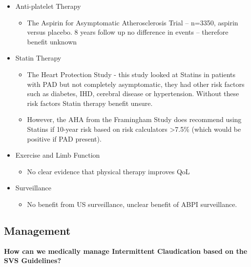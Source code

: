 \documentclass[
]{book}
\providecommand{\tightlist}{%
  \setlength{\itemsep}{0pt}\setlength{\parskip}{0pt}}
\begin{document}
\begin{itemize}
\item
  Anti-platelet Therapy

  \begin{itemize}
  \tightlist
  \item
    The Aspirin for Asymptomatic Atherosclerosis Trial -- n=3350,
    aspirin versus placebo. 8 years follow up no difference in
    events \citep{fowkesAspirinPreventionCardiovascular2010} -- therefore
    benefit unknown
  \end{itemize}
\item
  Statin Therapy

  \begin{itemize}
  \item
    The Heart Protection Study
    \citep{heartprotectionstudycollaborativegroupRandomizedTrialEffects2007} -
    this study looked at Statins in patients with PAD but not
    completely asymptomatic, they had other risk factors such as
    diabetes, IHD, cerebral disease or hypertension. Without these
    risk factors Statin therapy benefit unsure.
  \item
    However, the AHA from the Framingham Study does recommend using
    Statins if 10-year risk based on risk calculators \textgreater7.5\% (which
    would be positive if PAD present).
  \end{itemize}
\item
  Exercise and Limb Function

  \begin{itemize}
  \tightlist
  \item
    No clear evidence that physical therapy improves QoL
  \end{itemize}
\item
  Surveillance

  \begin{itemize}
  \tightlist
  \item
    No benefit from US surveillance, unclear benefit of ABPI
    surveillance.
  \end{itemize}
\end{itemize}

\hypertarget{management-17}{%
\subsection{Management}\label{management-17}}

\textbf{How can we medically manage Intermittent Claudication based on the SVS
Guidelines?}
\end{document}
